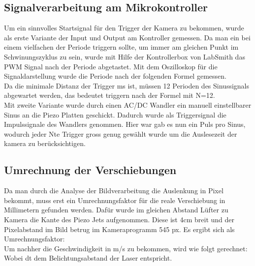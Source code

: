 \subsection{Signalverarbeitung am Mikrokontroller}
Um ein sinnvolles Startsignal für den Trigger der Kamera zu bekommen, wurde als erste Variante der Input und Output am Kontroller gemessen. Da man ein bei einem vielfachen der Periode triggern sollte, um immer am gleichen Punkt im Schwinungszyklus zu sein, wurde mit Hilfe der Kontrollerbox von LabSmith das PWM Signal nach der Periode abgetastet. Mit dem Oszilloskop für die Signaldarstellung wurde die Periode nach der folgenden Formel gemessen.\\
Da die minimale Distanz der Trigger ms ist, müssen 12 Perioden des Sinussignals abgewartet werden, das bedeutet triggern nach der Formel mit N=12.\\
Mit zweite Variante wurde durch einen AC/DC Wandler ein manuell einstellbarer Sinus an die Piezo Platten geschickt. Dadurch wurde als Triggersignal die Impulssignale des Wandlers genommen. Hier war gab es nun ein Puls pro Sinus, wodurch jeder Nte Trigger gross genug gewählt wurde um die Auslesezeit der kamera zu berücksichtigen.
\subsection{Umrechnung der Verschiebungen}   
Da man durch die Analyse der Bildverarbeitung die Auslenkung in Pixel bekommt, muss erst ein Umrechnungsfaktor für die reale Verschiebung in Millimetern gefunden werden. Dafür wurde im gleichen Abstand Lüfter zu Kamera die Kante des Piezo Jets aufgenommen. Diese ist 4cm breit und der Pixelabstand im Bild betrug im Kameraprogramm 545 px. Es ergibt sich als Umrechnungsfaktor:\\
Um nachher die Geschwindigkeit in m/s zu bekommen, wird wie folgt gerechnet:\\
Wobei dt dem Belichtungsabstand der Laser entspricht.
